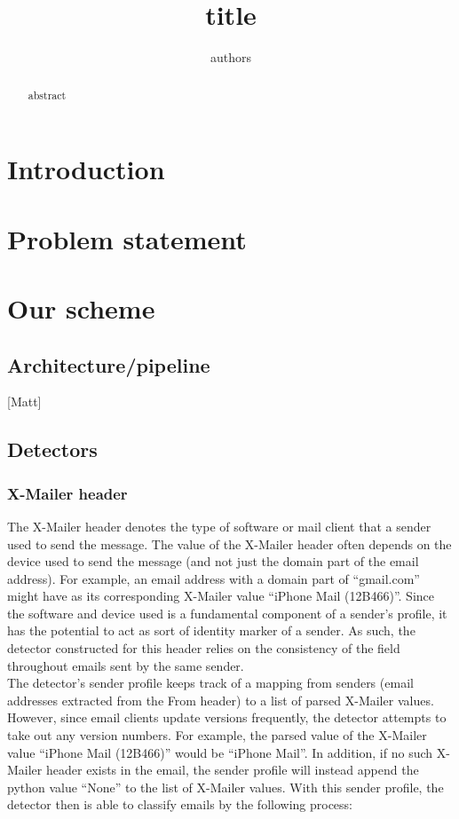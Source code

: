 \documentclass[letterpaper]{article}
\newcommand\tab[1][1cm]{\hspace*{#1}}
\begin{document}
\title{title}
\author{authors}
\maketitle

\begin{abstract}
abstract
\end{abstract}

\section{Introduction}
\section{Problem statement}
\section{Our scheme}
\subsection{Architecture/pipeline}
[Matt]
\subsection{Detectors}
\subsubsection{X-Mailer header}
\tab The X-Mailer header denotes the type of software or mail client that a sender used to send the message. The value of the X-Mailer header often depends on the device used to send the message (and not just the domain part of the email address). For example, an email address with a domain part of	``gmail.com'' might have as its corresponding X-Mailer value ``iPhone Mail (12B466)''. Since the software and device used is a fundamental component of a sender's profile, it has the potential to act as sort of identity marker of a sender. As such, the detector constructed for this header relies on the consistency of the field throughout emails sent by the same sender.\\
\tab The detector's sender profile keeps track of a mapping from senders (email addresses extracted from the From header) to a list of parsed X-Mailer values. However, since email clients update versions frequently, the detector attempts to take out any version numbers. For example, the parsed value of the X-Mailer value ``iPhone Mail (12B466)'' would be ``iPhone Mail''. In addition, if no such X-Mailer header exists in the email, the sender profile will instead append the python value ``None'' to the list of X-Mailer values. With this sender profile, the detector then is able to classify emails by the following process:
\end{document}
